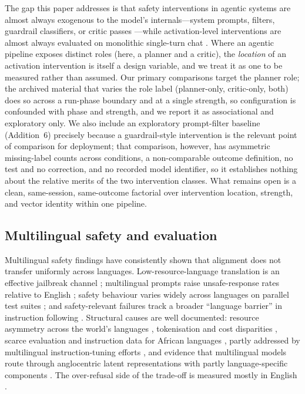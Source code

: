 The gap this paper addresses is that safety interventions in agentic systems are
almost always exogenous to the model's internals---system prompts, filters,
guardrail classifiers, or critic passes
\citep{inan2023llamaguard,rebedea2023nemoguardrails}---while activation-level
interventions are almost always evaluated on monolithic single-turn chat
\citep{rimsky2024steering,arditi2024refusal}. Where an agentic pipeline exposes
distinct roles (here, a planner and a critic), the \emph{location} of an
activation intervention is itself a design variable, and we treat it as one to be
measured rather than assumed. Our primary comparisons target the planner role;
the archived material that varies the role label (planner-only, critic-only,
both) does so across a run-phase boundary and at a single strength, so
configuration is confounded with phase and strength, and we report it as
associational and exploratory only. We also include an exploratory prompt-filter
baseline (Addition~6) precisely because a guardrail-style intervention
\citep{inan2023llamaguard} is the relevant point of comparison for deployment;
that comparison, however, has asymmetric missing-label counts across conditions,
a non-comparable outcome definition, no test and no correction, and no recorded
model identifier, so it establishes nothing about the relative merits of the two
intervention classes. What remains open is a clean, same-session, same-outcome
factorial over intervention location, strength, and vector identity within one
pipeline.

\subsection{Multilingual safety and evaluation}

Multilingual safety findings have consistently shown that alignment does not
transfer uniformly across languages. Low-resource-language translation is an
effective jailbreak channel \citep{yong2024lowresource}; multilingual prompts
raise unsafe-response rates relative to English \citep{deng2024multilingual};
safety behaviour varies widely across languages on parallel test suites
\citep{wang2024all}; and safety-relevant failures track a broader ``language
barrier'' in instruction following \citep{shen2024language}. Structural causes
are well documented: resource asymmetry across the world's languages
\citep{joshi2020state}, tokenisation and cost disparities
\citep{ahia2023languages}, scarce evaluation and instruction data for African
languages
\citep{adelani2021masakhaner,adelani2022masakhaner2,adelani2024irokobench,ogundepo2023afriqa,nekoto2020participatory},
partly addressed by multilingual instruction-tuning efforts
\citep{ustun2024aya,singh2024aya}, and evidence that multilingual models route
through anglocentric latent representations with partly language-specific
components \citep{wendler2024llamas,tang2024languagespecific}. The over-refusal
side of the trade-off is measured mostly in English
\citep{rottger2024xstest,cui2024orbench}.

